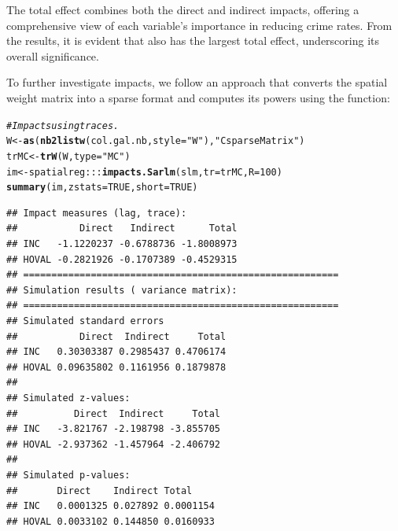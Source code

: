 \documentclass[english,12pt]{book}\usepackage[]{graphicx}\usepackage[]{xcolor}
\makeatletter
\newcommand{\hlnum}[1]{\textcolor[rgb]{0.686,0.059,0.569}{#1}}%
\newcommand{\hlstr}[1]{\textcolor[rgb]{0.192,0.494,0.8}{#1}}%
\newcommand{\hlcom}[1]{\textcolor[rgb]{0.678,0.584,0.686}{\textit{#1}}}%
\newcommand{\hlopt}[1]{\textcolor[rgb]{0,0,0}{#1}}%
\newcommand{\hlstd}[1]{\textcolor[rgb]{0.345,0.345,0.345}{#1}}%
\newcommand{\hlkwb}[1]{\textcolor[rgb]{0.69,0.353,0.396}{#1}}%
\newcommand{\hlkwc}[1]{\textcolor[rgb]{0.333,0.667,0.333}{#1}}%
\newcommand{\hlkwd}[1]{\textcolor[rgb]{0.737,0.353,0.396}{\textbf{#1}}}%
\newenvironment{kframe}{%
 \def\at@end@of@kframe{}%
 \ifinner\ifhmode%
  \def\at@end@of@kframe{\end{minipage}}%
  \begin{minipage}{\columnwidth}%
 \fi\fi%
 \def\FrameCommand##1{\hskip\@totalleftmargin \hskip-\fboxsep
 \colorbox{shadecolor}{##1}\hskip-\fboxsep
     \hskip-\linewidth \hskip-\@totalleftmargin \hskip\columnwidth}%
 \MakeFramed {\advance\hsize-\width
   \@totalleftmargin\z@ \linewidth\hsize
   \@setminipage}}%
 {\par\unskip\endMakeFramed%
 \at@end@of@kframe}
\newenvironment{knitrout}{}{} %
\makeatother
\begin{document}
The total effect combines both the direct and indirect impacts, offering a comprehensive view of each variable’s importance in reducing crime rates. From the results, it is evident that  also has the largest total effect, underscoring its overall significance.

To further investigate impacts, we follow an approach that converts the spatial weight matrix into a sparse format and computes its powers using the  function:
\begin{knitrout}
\color{fgcolor}\begin{kframe}
\begin{alltt}
\hlcom{# Impacts using traces. }
\hlstd{W} \hlkwb{<-} \hlkwd{as}\hlstd{(}\hlkwd{nb2listw}\hlstd{(col.gal.nb,} \hlkwc{style} \hlstd{=} \hlstr{"W"}\hlstd{),} \hlstr{"CsparseMatrix"}\hlstd{)}
\hlstd{trMC} \hlkwb{<-} \hlkwd{trW}\hlstd{(W,} \hlkwc{type} \hlstd{=} \hlstr{"MC"}\hlstd{)}
\hlstd{im} \hlkwb{<-} \hlstd{spatialreg}\hlopt{:::}\hlkwd{impacts.Sarlm}\hlstd{(slm,} \hlkwc{tr} \hlstd{= trMC,} \hlkwc{R} \hlstd{=} \hlnum{100}\hlstd{)}
\hlkwd{summary}\hlstd{(im,} \hlkwc{zstats} \hlstd{=}  \hlnum{TRUE}\hlstd{,} \hlkwc{short} \hlstd{=} \hlnum{TRUE}\hlstd{)}
\end{alltt}
\begin{verbatim}
## Impact measures (lag, trace):
##           Direct   Indirect      Total
## INC   -1.1220237 -0.6788736 -1.8008973
## HOVAL -0.2821926 -0.1707389 -0.4529315
## ========================================================
## Simulation results ( variance matrix):
## ========================================================
## Simulated standard errors
##           Direct  Indirect     Total
## INC   0.30303387 0.2985437 0.4706174
## HOVAL 0.09635802 0.1161956 0.1879878
## 
## Simulated z-values:
##          Direct  Indirect     Total
## INC   -3.821767 -2.198798 -3.855705
## HOVAL -2.937362 -1.457964 -2.406792
## 
## Simulated p-values:
##       Direct    Indirect Total    
## INC   0.0001325 0.027892 0.0001154
## HOVAL 0.0033102 0.144850 0.0160933
\end{verbatim}
\end{kframe}
\end{knitrout}
\end{document}

